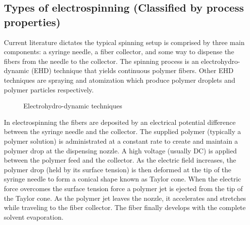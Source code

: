\documentclass[5p,,preprint,12pt,twocolumn]{elsarticle}
\makeatletter
\def\fixFloatSize#1{}%
\makeatother
\begin{document}
\subsection{Types of electrospinning (Classified by process properties)}Current literature dictates the typical spinning setup is comprised by three main components: a syringe needle, a fiber collector, and some way to dispense the fibers from the needle to the collector. The spinning process is an electrohydro-dynamic (EHD) technique that yields continuous polymer fibers. Other EHD techniques are spraying and atomization which produce polymer droplets and polymer particles respectively.


\bgroup
\fixFloatSize{images/f10bcbc9-719b-4a8d-8a38-930cc6ea2d0f-uimg_ehdprocesses.jpg}
\begin{figure}[!htbp]
\centering \makeatletter{}
\makeatother 
\caption{{Electrohydro-dynamic techniques}}
\label{f-02e0e3cf88d6}
\end{figure}
\egroup
In electrospinning the fibers are deposited by an electrical potential difference between the syringe needle and the collector. The supplied polymer (typically a polymer solution) is administrated at a constant rate to create and maintain a polymer drop at the dispensing nozzle. A high voltage (usually DC) is applied between the polymer feed and the collector. As the electric field increases, the polymer drop (held by its surface tension) is then deformed at the tip of the syringe needle to form a conical shape known as Taylor cone. When the electric force overcomes the surface tension force a polymer jet is ejected from the tip of the Taylor cone. As the polymer jet leaves the nozzle, it accelerates and stretches while traveling to the fiber collector. The fiber finally develops with the complete solvent evaporation.
\end{document}
